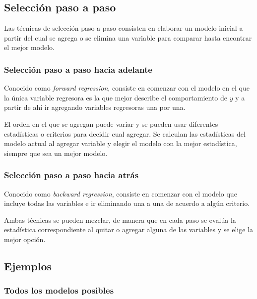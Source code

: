 \documentclass[
]{book}
\begin{document}
\subsection{Selección paso a paso}\label{selecciuxf3n-paso-a-paso}

Las técnicas de selección paso a paso consisten en elaborar un modelo inicial a partir del cual se agrega o se elimina una variable para comparar hasta encontrar el mejor modelo.

\subsubsection{Selección paso a paso hacia adelante}\label{selecciuxf3n-paso-a-paso-hacia-adelante}

Conocido como \emph{forward regression}, consiste en comenzar con el modelo en el que la única variable regresora es la que mejor describe el comportamiento de \(y\) y a partir de ahí ir agregando variables regresoras una por una.

El orden en el que se agregan puede variar y se pueden usar diferentes estadísticas o criterios para decidir cual agregar. Se calculan las estadísticas del modelo actual al agregar variable y elegir el modelo con la mejor estadística, siempre que sea un mejor modelo.

\subsubsection{Selección paso a paso hacia atrás}\label{selecciuxf3n-paso-a-paso-hacia-atruxe1s}

Conocido como \emph{backward regression}, consiste en comenzar con el modelo que incluye todas las variables e ir eliminando una a una de acuerdo a algún criterio.

Ambas técnicas se pueden mezclar, de manera que en cada paso se evalúa la estadística correspondiente al quitar o agregar alguna de las variables y se elige la mejor opción.

\subsection{Ejemplos}\label{ejemplos}

\subsubsection{Todos los modelos posibles}\label{todos-los-modelos-posibles-1}
\end{document}
